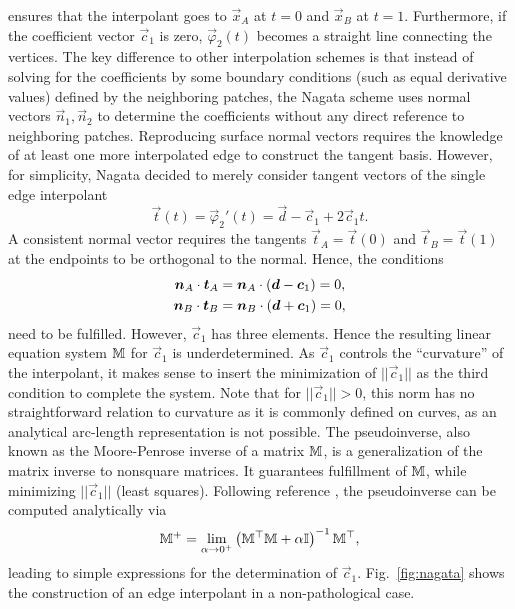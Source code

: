 \documentclass[twocolumn]{biophys-new}
\renewcommand{\identity}{\tensorq{I}}
\begin{document}
\noindent
ensures that the interpolant goes to $\vec{x}_A$ at $t=0$ and $\vec{x}_B$ at $t=1$. Furthermore, if the coefficient vector $\vec{c}_1$ is zero, $\vec{\varphi}_2(t)$ becomes a straight line connecting the vertices. The key difference to other interpolation schemes is that instead of solving for the coefficients by some boundary conditions (such as equal derivative values) defined by the neighboring patches, the Nagata scheme uses normal vectors $\vec{n}_1, \vec{n}_2$ to determine the coefficients without any direct reference to neighboring patches.
Reproducing surface normal vectors requires the knowledge of at least one more interpolated edge to construct the tangent basis. However, for simplicity, Nagata decided to merely consider tangent vectors of the single edge interpolant
\begin{equation}
 \vec{t}(t)= \vec{\varphi}_2'(t) = \vec{d}  - \vec{c}_1  + 2\vec{c}_1 t.
\end{equation}
A consistent normal vector requires the tangents $\vec{t}_A = \vec{t}(0)$ and $\vec{t}_B = \vec{t}(1)$ at the endpoints to be orthogonal to the normal. Hence, the conditions
\begin{subequations}
  \begin{align}
    \bm{n}_A \cdot \bm{t}_A &=  \bm{n}_A \cdot \left( \bm{d}  - \bm{c}_1 \right) = 0,
    \\
    \bm{n}_B \cdot \bm{t}_B &=  \bm{n}_B \cdot \left( \bm{d}  + \bm{c}_1 \right) = 0,
   \end{align}
\end{subequations} 
need to be fulfilled. However, $\vec{c}_1$ has three elements. Hence the resulting linear equation system $\mathbb{M}$  for $\vec{c}_1$ is underdetermined. As $\vec{c}_1$ controls the ``curvature'' of the interpolant, it makes sense to insert the minimization of $||\vec{c}_1||$ as the third condition to complete the system. Note that for $||\vec{c}_1|| > 0$, this norm has no straightforward relation to curvature as it is commonly defined on curves, as an analytical arc-length representation is not possible.
The pseudoinverse, also known as the Moore-Penrose inverse of a matrix $\mathbb{M}$,
is a generalization of the matrix inverse to nonsquare matrices. It guarantees fulfillment of $\mathbb{M}$, while minimizing $||\vec{c}_1||$ (least squares).  Following reference \cite{NAGATA2005327}, the pseudoinverse can  be computed analytically via
\begin{equation}
  \tensorq{M}^{+}
  =
  \lim_{\alpha \to 0^+} \inverse{\parens{\transpose{\tensorq{M}}\tensorq{M} + \alpha \identity}} \transpose{\tensorq{M}},
\end{equation}
leading to simple expressions for the determination of $\vec{c}_1$.  Fig.~\ref{fig:nagata} shows the construction of an edge interpolant in a non-pathological case.
\end{document}
